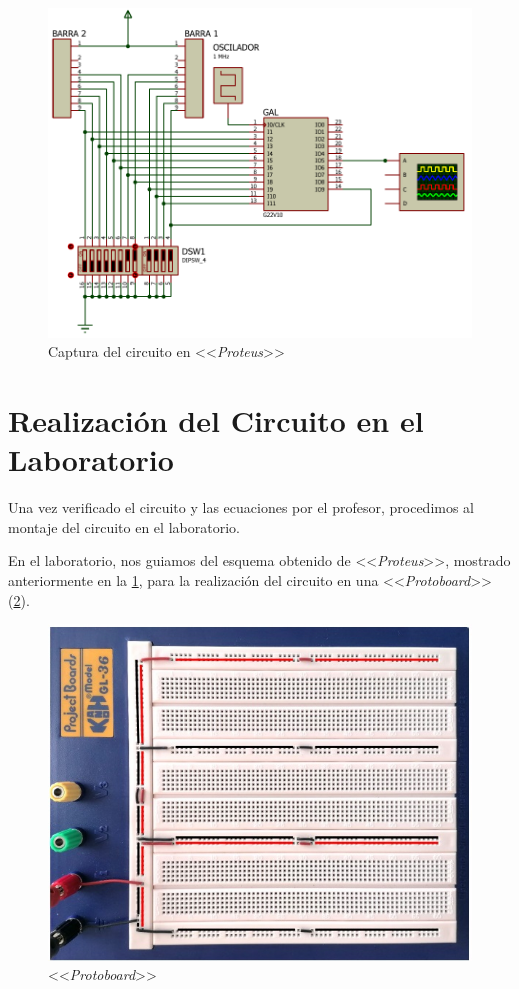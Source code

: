 \begin{figure}[!htb]
\end{figure}

\begin{figure}[!htb]
    \centering
    \includegraphics[width=\linewidth]{include/figures/esquema.pdf}
    \caption{Captura del circuito en <<\textit{Proteus}>>}
    \label{circuito-proteus}
\end{figure}



\section*{Realización del Circuito en el Laboratorio}
Una vez verificado el circuito y las ecuaciones por el profesor, procedimos al montaje del circuito en el laboratorio. 

En el laboratorio, nos guiamos del esquema obtenido de <<\textit{Proteus}>>, mostrado anteriormente en la \cref{circuito-proteus}, para la realización del circuito en una <<\textit{Protoboard}>> (\cref{Protoboard}).

    \begin{figure}[!htb]
        \centering
        \includegraphics[width=0.5\linewidth]{include/figures/Protoboard.jpg}
        \caption{<<\textit{Protoboard}>>}
        \label{Protoboard}
    \end{figure}
    


